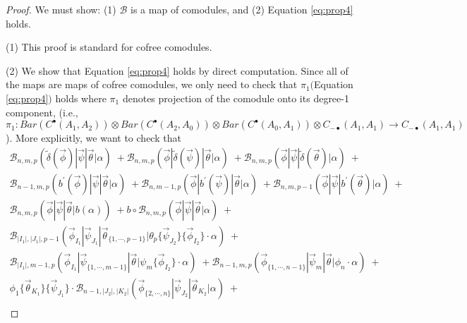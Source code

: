 \begin{proof}
We must show: (1) $\mathcal{B}$ is a map of comodules, and (2) Equation \ref{eq:prop4} holds.

(1) This proof is standard for cofree comodules. 

(2) We show that Equation \ref{eq:prop4} holds by direct computation. Since all of the maps are maps of cofree comodules, we only need to check that $\pi_1($Equation \ref{eq:prop4}$)$ holds where $\pi_1$ denotes projection of the comodule onto its degree-1 component, (i.e., $\pi_1: Bar(C^\bullet(A_1, A_2)) \otimes Bar(C^\bullet(A_2, A_0)) \otimes Bar(C^\bullet(A_0, A_1)) \otimes C_{-\bullet}(A_1, A_1) \rightarrow C_{-\bullet}(A_1, A_1)$). More explicitly, we want to check that
\begin{equation} \label{eq:prop4_expand}
\begin{aligned}
\mathcal{B}_{n, m, p} ( \tilde{\delta}(\vec{\phi}) | \vec{\psi} | \vec{\theta} | \alpha ) \; + 
\mathcal{B}_{n, m, p} ( \vec{\phi} | \tilde{\delta}(\vec{\psi}) | \vec{\theta} | \alpha ) \; + 
\mathcal{B}_{n, m, p} ( \vec{\phi} | \vec{\psi} | \tilde{\delta}(\vec{\theta}) | \alpha ) \; + \\
\mathcal{B}_{n-1, m, p} ( b^\prime(\vec{\phi}) | \vec{\psi} | \vec{\theta} | \alpha ) \; + 
\mathcal{B}_{n, m-1, p} ( \vec{\phi} | b^\prime(\vec{\psi}) | \vec{\theta} | \alpha ) \; + 
\mathcal{B}_{n, m, p-1} ( \vec{\phi} | \vec{\psi} | b^\prime(\vec{\theta}) | \alpha ) \; + \\
\mathcal{B}_{n, m, p} ( \vec{\phi} | \vec{\psi} | \vec{\theta} | b(\alpha) ) \; + 
b \circ \mathcal{B}_{n, m, p} ( \vec{\phi} | \vec{\psi} | \vec{\theta} | \alpha ) \; + \\
 \mathcal{B}_{|I_1|, |J_1|, p-1}(\vec{\phi}_{I_1} | \vec{\psi}_{J_1} | \vec{\theta}_{\{1,\cdots, p-1\}} |
     \theta_{p} \{\vec{\psi}_{J_2}\} \{\vec{\phi}_{I_2}\} \cdot \alpha ) \; + \\
 \mathcal{B}_{|I_1|, m-1, p}(\vec{\phi}_{I_1} | \vec{\psi}_{\{1,\cdots, m-1\}} | \vec{\theta} |
     \psi_{m} \{\vec{\phi}_{I_2}\}\cdot \alpha ) \; + 
\mathcal{B}_{n-1, m, p}(\vec{\phi}_{\{1,\cdots, n-1\}} |\vec{\psi}_{m} | \vec{\theta} | 
     \phi_{n} \cdot \alpha) \; + \\
\phi_1 \{\vec{\theta}_{K_1}\} \{\vec{\psi}_{J_1}\} \cdot
     \mathcal{B}_{n-1, |J_2|, |K_2|}
     (\vec{\phi}_{\{2,\cdots,n\}} | \vec{\psi}_{J_2} | \vec{\theta}_{K_2} | \alpha) \; + \\

\end{aligned}
\end{equation}
\end{proof}
